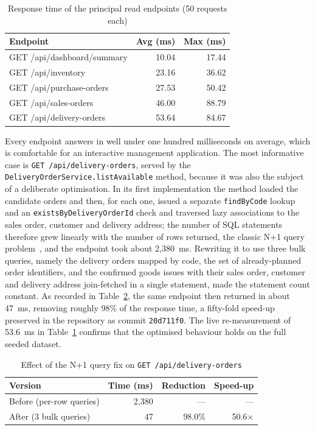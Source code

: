 \begin{table}[H]\centering
\caption{Response time of the principal read endpoints (50 requests each)}
\label{tab:resptime}
\begin{tabular}{|l|r|r|}
\hline
\textbf{Endpoint} & \textbf{Avg (ms)} & \textbf{Max (ms)} \\ \hline
GET /api/dashboard/summary & 10.04 & 17.44 \\ \hline
GET /api/inventory         & 23.16 & 36.62 \\ \hline
GET /api/purchase-orders   & 27.53 & 50.42 \\ \hline
GET /api/sales-orders      & 46.00 & 88.79 \\ \hline
GET /api/delivery-orders   & 53.64 & 84.67 \\ \hline
\end{tabular}
\end{table}

Every endpoint answers in well under one hundred milliseconds on average, which
is comfortable for an interactive management application. The most informative
case is \texttt{GET /api/delivery-orders}, served by the
\texttt{DeliveryOrderService.listAvailable} method, because it was also the
subject of a deliberate optimisation. In its first implementation the method
loaded the candidate orders and then, for each one, issued a separate
\texttt{findByCode} lookup and an \texttt{existsByDeliveryOrderId} check and
traversed lazy associations to the sales order, customer and delivery address;
the number of SQL statements therefore grew linearly with the number of rows
returned, the classic N+1 query problem~\cite{bauer2015hibernate}, and the
endpoint took about 2{,}380~ms. Rewriting it to use three bulk queries, namely
the delivery orders mapped by code, the set of already-planned order
identifiers, and the confirmed goods issues with their sales order, customer and
delivery address join-fetched in a single statement, made the statement count
constant. As recorded in Table~\ref{tab:n1}, the same endpoint then returned in
about 47~ms, removing roughly 98\% of the response time, a fifty-fold speed-up
preserved in the repository as commit \texttt{20d711f0}. The live re-measurement
of 53.6~ms in Table~\ref{tab:resptime} confirms that the optimised behaviour
holds on the full seeded dataset.

\begin{table}[H]\centering
\caption{Effect of the N+1 query fix on \texttt{GET /api/delivery-orders}}
\label{tab:n1}
\begin{tabular}{|l|r|r|r|}
\hline
\textbf{Version} & \textbf{Time (ms)} & \textbf{Reduction} & \textbf{Speed-up} \\ \hline
Before (per-row queries) & 2{,}380 & --- & --- \\ \hline
After (3 bulk queries)   & 47      & 98.0\% & 50.6$\times$ \\ \hline
\end{tabular}
\end{table}

